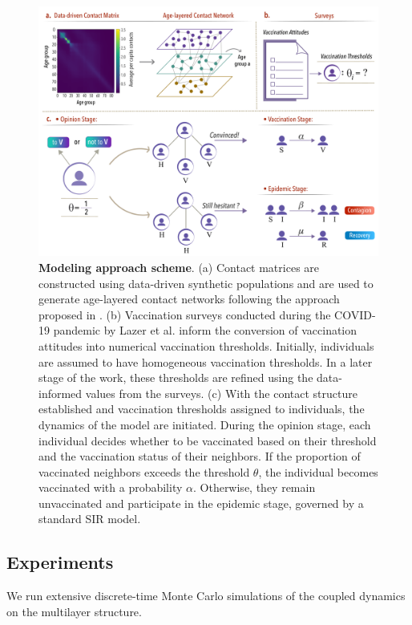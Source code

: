 \documentclass[
 reprint,
 amsmath,amssymb,
 aps,
]{revtex4-2}
\begin{document}
\begin{figure}
\centering
\includegraphics[width=\textwidth]{figure1.pdf}
\caption{\label{fig:main_approach}
\textbf{Modeling approach scheme}. (a) Contact matrices are constructed using data-driven synthetic populations \cite{mistry2021inferring} and are used to generate age-layered contact networks following the approach proposed in \cite{aleta2020data}. (b) Vaccination surveys conducted during the COVID-19 pandemic by Lazer et al. \cite{lazer2021covid} inform the conversion of vaccination attitudes into numerical vaccination thresholds. Initially, individuals are assumed to have homogeneous vaccination thresholds. In a later stage of the work, these thresholds are refined using the data-informed values from the surveys. (c) With the contact structure established and vaccination thresholds assigned to individuals, the dynamics of the model are initiated. During the opinion stage, each individual decides whether to be vaccinated based on their threshold and the vaccination status of their neighbors. If the proportion of vaccinated neighbors exceeds the threshold $\theta$, the individual becomes vaccinated with a probability $\alpha$. Otherwise, they remain unvaccinated and participate in the epidemic stage, governed by a standard SIR model.}
\end{figure}

\subsection{Experiments}
\label{subsec:experiments}

We run extensive discrete-time Monte Carlo simulations of the coupled dynamics on the multilayer structure.
\end{document}
